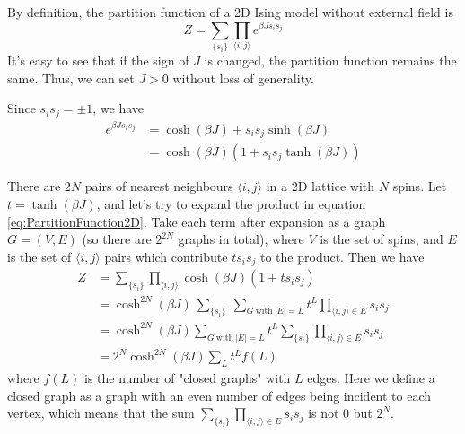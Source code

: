 \documentclass[11pt]{article}
\begin{document}
	By definition, the partition function of a 2D Ising model without external field is
	\begin{equation} \label{eq:PartitionFunction2D}
		Z = \sum_{\{s_i\}} \prod_{\langle i,j \rangle} e^{\beta J s_i s_j}
	\end{equation}
	It's easy to see that if the sign of $J$ is changed, the partition function remains the same. Thus, we can set $J > 0$ without loss of generality.

	Since $s_i s_j = \pm 1$, we have
	\begin{equation} \label{eq:PartitionFunction2DTransformingTrick}
		\begin{aligned}
			e^{\beta J s_i s_j} &= \cosh(\beta J) + s_i s_j \sinh(\beta J) \\
			&= \cosh(\beta J)(1 + s_i s_j \tanh(\beta J))
		\end{aligned}
	\end{equation}

	There are $2N$ pairs of nearest neighbours $\langle i,j \rangle$ in a 2D lattice with $N$ spins. Let $t = \tanh(\beta J)$, and let's try to expand the product in equation \eqref{eq:PartitionFunction2D}. Take each term after expansion as a graph $G = (V, E)$ (so there are $2^{2N}$ graphs in total), where $V$ is the set of spins, and $E$ is the set of $\langle i,j \rangle$ pairs which contribute $t s_i s_j$ to the product. Then we have
	\begin{equation} \label{eq:PartitionFunction2DTransformed}
		\begin{aligned}
			Z &= \sum_{\{s_i\}} \prod_{\langle i,j \rangle} \cosh(\beta J)(1 + t s_i s_j) \\
			&= \cosh^{2N}(\beta J)\ \sum_{\{s_i\}}\ \sum_{G\ \text{with}\ |E|=L} t^L \prod_{\langle i,j \rangle \in E} s_i s_j \\
			&= \cosh^{2N}(\beta J) \sum_{G\ \text{with}\ |E|=L} t^L \sum_{\{s_i\}} \prod_{\langle i,j \rangle \in E} s_i s_j \\
			&= 2^N \cosh^{2N}(\beta J) \sum_{L} t^L f(L)
		\end{aligned}
	\end{equation}
	where $f(L)$ is the number of "closed graphs" with $L$ edges. Here we define a closed graph as a graph with an even number of edges being incident to each vertex, which means that the sum $\sum_{\{s_i\}} \prod_{\langle i,j \rangle \in E} s_i s_j$ is not $0$ but $2^N$.
\end{document}
